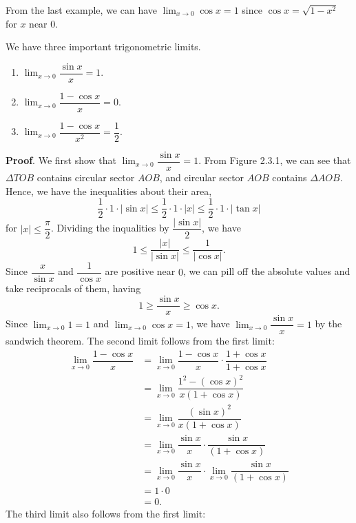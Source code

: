 \documentclass[11pt]{book}
\theoremstyle{break}
\theoremstyle{no_label}
\numberwithin{equation}{section}
\begin{document}
\begin{example}
    From the last example, we can have $\displaystyle\lim_{x\to 0}\cos x=1$ since $\cos x=\sqrt{1-x^2}$ for $x$ near $0$.
\end{example}

\begin{theorem}
    We have three important trigonometric limits.
    \begin{enumerate}
        \item $\displaystyle\lim_{x\to 0}\dfrac{\sin x}{x}=1$.
        \item $\displaystyle\lim_{x\to 0}\dfrac{1-\cos x}{x}=0$.
        \item $\displaystyle\lim_{x\to 0}\dfrac{1-\cos x}{x^2}=\dfrac{1}{2}$.
    \end{enumerate}
\end{theorem}
\textbf{Proof}. We first show that $\displaystyle\lim_{x\to 0}\dfrac{\sin x}{x}=1$. From Figure 2.3.1, we can see that $\Delta TOB$ contains circular sector $AOB$, and circular sector $AOB$ contains $\Delta AOB$. Hence, we have the inequalities about their area, $$\dfrac{1}{2}\cdot1\cdot |\sin x|\leq\dfrac{1}{2}\cdot1\cdot|x|\leq\dfrac{1}{2}\cdot 1\cdot |\tan x|$$ for $|x|\leq\dfrac{\pi}{2}$. Dividing the inqualities by $\dfrac{|\sin x|}{2}$, we have $$1\leq\dfrac{|x|}{|\sin x|}\leq\dfrac{1}{|\cos x|}.$$ Since $\dfrac{x}{\sin x}$ and $\dfrac{1}{\cos x}$ are positive near $0$, we can pill off the absolute values and take reciprocals of them, having $$1\geq\dfrac{\sin x}{x}\geq\cos x.$$ Since $\displaystyle\lim_{x\to 0}1=1$ and $\displaystyle\lim_{x\to 0}\cos x=1$, we have $\displaystyle\lim_{x\to 0}\dfrac{\sin x}{x}=1$ by the sandwich theorem. The second limit follows from the first limit:
\begin{align*}
    \lim_{x\to 0}\dfrac{1-\cos x}{x}&=\lim_{x\to 0}\dfrac{1-\cos x}{x}\cdot\dfrac{1+\cos x}{1+\cos x}\\
    &=\lim_{x\to 0}\dfrac{1^2-(\cos x)^2}{x(1+\cos x)}\\
    &=\lim_{x\to 0}\dfrac{(\sin x)^2}{x(1+\cos x)}\\
    &=\lim_{x\to 0}\dfrac{\sin x}{x}\cdot\dfrac{\sin x}{(1+\cos x)}\\
    &=\lim_{x\to 0}\dfrac{\sin x}{x}\cdot\lim_{x\to 0}\dfrac{\sin x}{(1+\cos x)}\\
    &=1\cdot0\\
    &=0.
\end{align*} The third limit also follows from the first limit: 
\end{document}
